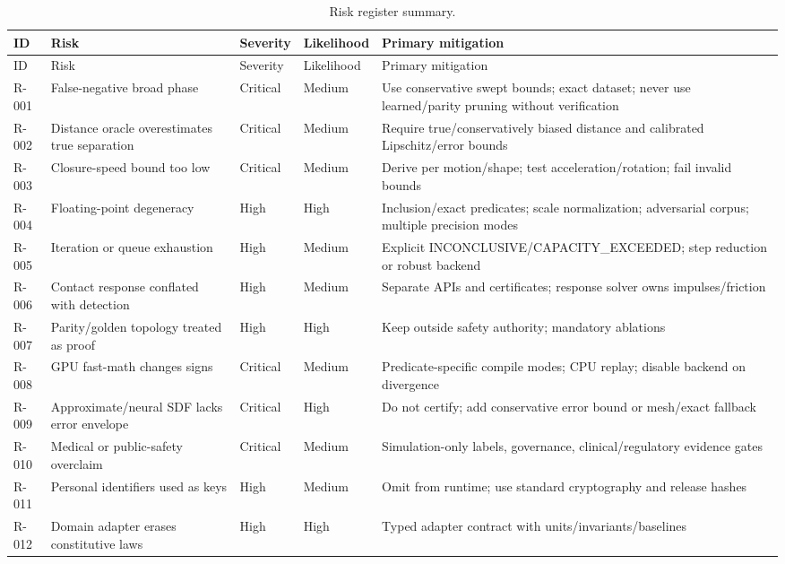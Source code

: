 \small\begin{longtable}{@{}L{0.08\textwidth}L{0.23\textwidth}L{0.10\textwidth}L{0.10\textwidth}L{0.385\textwidth}@{}}
\caption{Risk register summary.}\label{tab:risk-register}\\
\toprule ID & Risk & Severity & Likelihood & Primary mitigation \\ \midrule
\endfirsthead
\toprule ID & Risk & Severity & Likelihood & Primary mitigation \\ \midrule
\endhead
R-001 & False-negative broad phase & Critical & Medium & Use conservative swept bounds; exact dataset; never use learned/parity pruning without verification \\
R-002 & Distance oracle overestimates true separation & Critical & Medium & Require true/conservatively biased distance and calibrated Lipschitz/error bounds \\
R-003 & Closure-speed bound too low & Critical & Medium & Derive per motion/shape; test acceleration/rotation; fail invalid bounds \\
R-004 & Floating-point degeneracy & High & High & Inclusion/exact predicates; scale normalization; adversarial corpus; multiple precision modes \\
R-005 & Iteration or queue exhaustion & High & Medium & Explicit INCONCLUSIVE/CAPACITY\_EXCEEDED; step reduction or robust backend \\
R-006 & Contact response conflated with detection & High & Medium & Separate APIs and certificates; response solver owns impulses/friction \\
R-007 & Parity/golden topology treated as proof & High & High & Keep outside safety authority; mandatory ablations \\
R-008 & GPU fast-math changes signs & Critical & Medium & Predicate-specific compile modes; CPU replay; disable backend on divergence \\
R-009 & Approximate/neural SDF lacks error envelope & Critical & High & Do not certify; add conservative error bound or mesh/exact fallback \\
R-010 & Medical or public-safety overclaim & Critical & Medium & Simulation-only labels, governance, clinical/regulatory evidence gates \\
R-011 & Personal identifiers used as keys & High & Medium & Omit from runtime; use standard cryptography and release hashes \\
R-012 & Domain adapter erases constitutive laws & High & High & Typed adapter contract with units/invariants/baselines \\
\bottomrule
\end{longtable}
